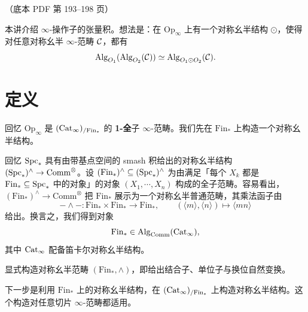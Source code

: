 \begin{center}\small\color{black!55}（底本 PDF 第 193–198 页）\end{center}

本讲介绍 $\infty$-操作子的张量积。想法是：在 $\mathrm{Op}_{\infty}$ 上有一个对称幺半结构 $\odot$，使得对任意对称幺半 $\infty$-范畴 $\mathcal{C}$，都有
\[
\operatorname{Alg}_{O_{1}}(\operatorname{Alg}_{O_{2}}(\mathcal{C}))\simeq\operatorname{Alg}_{O_{1}\odot O_{2}}(\mathcal{C}).
\]


\section{定义}

\nitem\label{L26-1.1} 回忆 $\mathrm{Op}_{\infty}$ 是 $(\operatorname{Cat}_{\infty})_{/\mathrm{Fin}_{*}}$ 的 \textbf{1-全}子 $\infty$-范畴。我们先在 $\mathrm{Fin}_{*}$ 上构造一个对称幺半结构。

\begin{construction}\label{L26-1.2}
回忆 $\operatorname{Spc}_{*}$ 具有由带基点空间的 smash 积给出的对称幺半结构 $(\operatorname{Spc}_{*})^{\wedge}\to\mathrm{Comm}^{\otimes}$。设 $(\mathrm{Fin}_{*})^{\wedge}\subseteq(\operatorname{Spc}_{*})^{\wedge}$ 为由满足「每个 $X_{k}$ 都是 $\mathrm{Fin}_{*}\subseteq\operatorname{Spc}_{*}$ 中的对象」的对象 $(X_{1},\cdots,X_{n})$ 构成的全子范畴。容易看出，$(\mathrm{Fin}_{*})^{\wedge}\to\mathrm{Comm}^{\otimes}$ 把 $\mathrm{Fin}_{*}$ 展示为一个对称幺半普通范畴，其乘法函子由
\[
-\wedge-\colon\mathrm{Fin}_{*}\times\mathrm{Fin}_{*}\to\mathrm{Fin}_{*},\qquad
(\langle m\rangle,\langle n\rangle)\mapsto\langle mn\rangle
\]
给出。换言之，我们得到对象
\[
\mathrm{Fin}_{*}\in\operatorname{Alg}_{\mathrm{Comm}}(\operatorname{Cat}_{\infty}),
\]
其中 $\operatorname{Cat}_{\infty}$ 配备笛卡尔对称幺半结构。
\end{construction}

\begin{exercise}\label{L26-1.3}
显式构造对称幺半范畴 $(\mathrm{Fin}_{*},\wedge)$，即给出结合子、单位子与换位自然变换。
\end{exercise}

\nitem\label{L26-1.4} 下一步是利用 $\mathrm{Fin}_{*}$ 上的对称幺半结构，在 $(\operatorname{Cat}_{\infty})_{/\mathrm{Fin}_{*}}$ 上构造对称幺半结构。这个构造对任意切片 $\infty$-范畴都适用。

